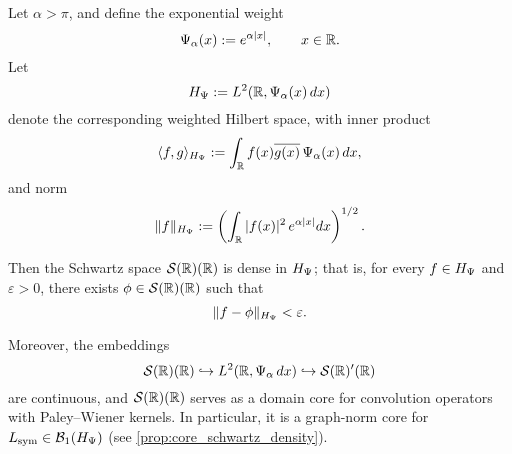 \begin{lemma}
\label{lem:density_schwartz_weighted_L2}
Let \( \alpha > \pi \), and define the exponential weight
\[
\Psi_\alpha(x) := e^{\alpha |x|}, \qquad x \in \mathbb{R}.
\]
Let
\[
H_{\Psi} := L^2(\mathbb{R}, \Psi_\alpha(x)\, dx)
\]
denote the corresponding weighted Hilbert space, with inner product
\[
\langle f, g \rangle_{H_{\Psi}} := \int_{\mathbb{R}} f(x) \overline{g(x)}\, \Psi_\alpha(x)\, dx,
\]
and norm
\[
\|f\|_{H_{\Psi}} := \left( \int_{\mathbb{R}} |f(x)|^2\, e^{\alpha |x|} dx \right)^{1/2}.
\]

Then the Schwartz space \( \mathcal{S}(\mathbb{R})(\mathbb{R}) \) is dense in \( H_{\Psi} \); that is, for every \( f \in H_{\Psi} \) and \( \varepsilon > 0 \), there exists \( \phi \in \mathcal{S}(\mathbb{R})(\mathbb{R}) \) such that
\[
\| f - \phi \|_{H_{\Psi}} < \varepsilon.
\]

\medskip
\noindent
Moreover, the embeddings
\[
\mathcal{S}(\mathbb{R})(\mathbb{R}) \hookrightarrow L^2(\mathbb{R}, \Psi_\alpha\, dx) \hookrightarrow \mathcal{S}(\mathbb{R})'(\mathbb{R})
\]
are continuous, and \( \mathcal{S}(\mathbb{R})(\mathbb{R}) \) serves as a domain core for convolution operators with Paley--Wiener kernels. In particular, it is a graph-norm core for \( L_{\mathrm{sym}} \in \mathcal{B}_1(H_{\Psi}) \) (see \cref{prop:core_schwartz_density}).
\end{lemma}
